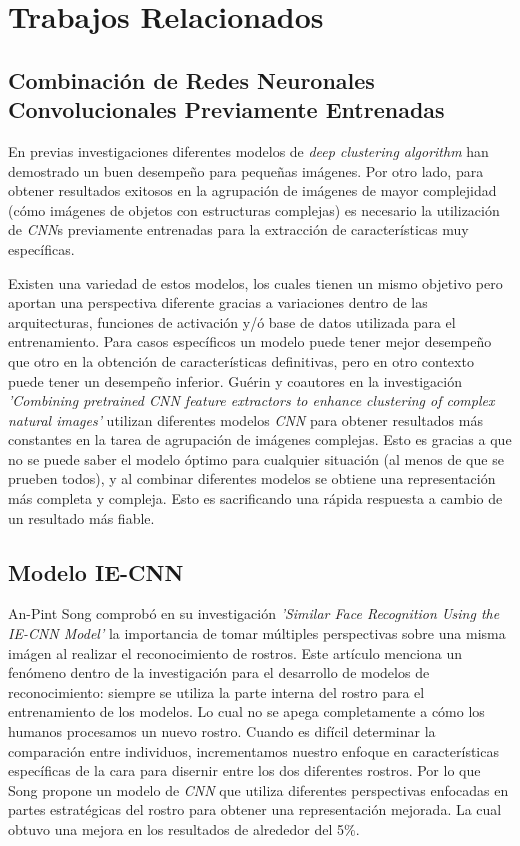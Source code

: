 \documentclass[a4paper, 10pt, conference]{ieeeconf}      %
\begin{document}
    \section{Trabajos Relacionados}

    \subsection{Combinación de Redes Neuronales Convolucionales Previamente Entrenadas}
    En previas investigaciones diferentes modelos de \textit{deep clustering algorithm}
    han demostrado un buen desempeño para pequeñas imágenes. Por otro lado, para
    obtener resultados exitosos en la agrupación de imágenes de mayor complejidad
    (cómo imágenes de objetos con estructuras complejas) es necesario la utilización
    de \textit{CNN}s previamente entrenadas para la extracción de características muy específicas.
    
    Existen una variedad de estos modelos, los cuales tienen un mismo objetivo pero aportan una
    perspectiva diferente gracias a variaciones dentro de las arquitecturas, funciones de
    activación y/ó base de datos utilizada para el entrenamiento. Para casos específicos un modelo
    puede tener mejor desempeño que otro en la obtención de características definitivas, pero en
    otro contexto puede tener un desempeño inferior. Guérin y coautores en la investigación
    \textit{'Combining pretrained CNN feature extractors to enhance clustering of complex natural images'}
    utilizan diferentes modelos \textit{CNN} para obtener resultados más constantes en la tarea de
    agrupación de imágenes complejas. Esto es gracias a que no se puede saber el modelo óptimo para
    cualquier situación (al menos de que se prueben todos), y al combinar diferentes modelos se
    obtiene una representación más completa y compleja. Esto es sacrificando una rápida respuesta
    a cambio de un resultado más fiable.\cite{CombiningCNN}


    \subsection{Modelo IE-CNN}
    An-Pint Song comprobó en su investigación \textit{'Similar Face Recognition Using the IE-CNN
    Model'} la importancia de tomar múltiples perspectivas sobre una misma imágen al realizar el
    reconocimiento de rostros. Este artículo menciona un fenómeno dentro de la investigación para
    el desarrollo de modelos de reconocimiento: siempre se utiliza la parte interna del rostro
    para el entrenamiento de los modelos. Lo cual no se apega completamente a cómo los humanos
    procesamos un nuevo rostro. Cuando es difícil determinar la comparación entre individuos,
    incrementamos nuestro enfoque en características específicas de la cara para disernir entre los
    dos diferentes rostros. \cite{Young1987} \cite{Andrews2010} Por lo que Song propone un modelo
    de \textit{CNN} que utiliza diferentes perspectivas enfocadas en partes estratégicas del rostro
    para obtener una representación mejorada. La cual obtuvo una mejora en los resultados de
    alrededor del 5\%. \cite{IECNN}
\end{document}
